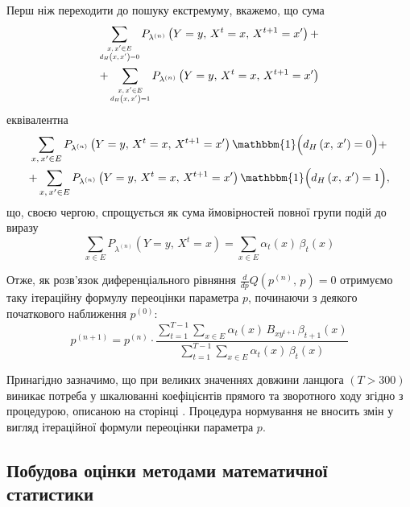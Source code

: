 Перш ніж переходити до пошуку екстремуму, вкажемо, що сума
\begin{multline*}
    \sum\limits_{\scaleq[0.8]{\substack{x,\,x' \in E \\ d_H\left( x,\,x' \right) = 0}}} P_{\lambda^{(n)}} \left( Y=y,\, X^t=x,\, X^{t+1}=x' \right) + \\ + \sum\limits_{\scaleq[0.8]{\substack{x,\,x' \in E \\ d_H\left( x,\,x' \right) = 1}}} P_{\lambda^{(n)}} \left( Y=y,\, X^t=x,\, X^{t+1}=x' \right)
\end{multline*}\label{eq: simplified denominator}
еквівалентна
\begin{multline*}
    \sum\limits_{x,\,x' \in E} P_{\lambda^{(n)}} \left( Y=y,\, X^t=x,\, X^{t+1}=x' \right) \mathbbm{1} \Bigl( d_H\left( x,\,x' \right) = 0 \Bigr) + \\ + \sum\limits_{x,\,x' \in E} P_{\lambda^{(n)}} \left( Y=y,\, X^t=x,\, X^{t+1}=x' \right) \mathbbm{1} \Bigl( d_H\left( x,\,x' \right) = 1 \Bigr),
\end{multline*}
що, своєю чергою, спрощується як сума ймовірностей повної групи подій до виразу
\begin{equation*}
    \sum\limits_{x \in E} P_{\lambda^{(n)}} \left( Y=y,\, X^t=x \right) = \sum\limits_{x \in E} \alpha_t(x)\,\beta_t(x)
\end{equation*}

Отже, як розв'язок диференціального рівняння $\frac{d}{dp} Q\left( p^{(n)},\,p \right) = 0$ отримуємо таку ітераційну формулу переоцінки параметра $p$, починаючи з деякого початкового наближення $p^{(0)}:$
\begin{equation}\label{eq: p baum-welch estimation}
    p^{(n+1)} = p^{(n)} \cdot \frac{
        \sum\limits_{t=1}^{T-1} \sum\limits_{x \in E} \alpha_t(x)\,B_{xy^{t+1}}\,\beta_{t+1}(x)
    }{
        \sum\limits_{t=1}^{T-1}\sum\limits_{x \in E} \alpha_t(x)\,\beta_t(x)
    }
\end{equation}

Принагідно зазначимо, що при великих значеннях довжини ланцюга $(T>300)$ виникає потреба у шкалюванні коефіцієнтів прямого та зворотного ходу згідно з процедурою, описаною на сторінці \pageref{eq: alpha, forward algorithm coefficients}. Процедура нормування не вносить змін у вигляд ітераційної формули переоцінки параметра $p$.

\subsection{Побудова оцінки методами математичної статистики}


